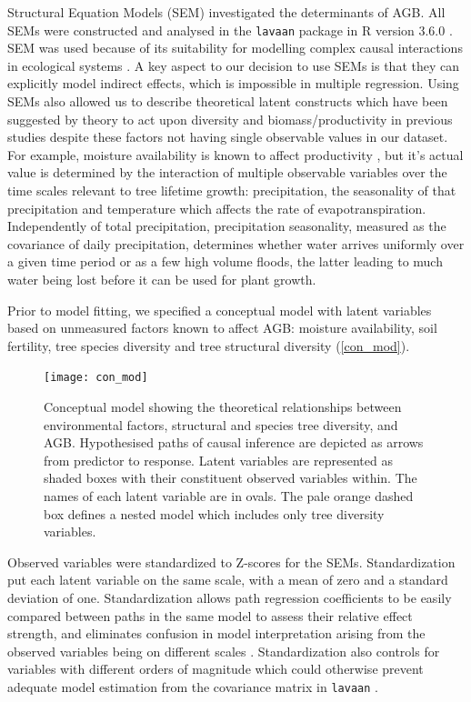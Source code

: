 \documentclass[11pt,a4paper]{article}
\begin{document}
Structural Equation Models (SEM) investigated the determinants of AGB. All SEMs were constructed and analysed in the \verb|lavaan| package in R version 3.6.0 \citep{R}. SEM was used because of its suitability for modelling complex causal interactions in ecological systems \citep{Lehmann2014_161-166}. A key aspect to our decision to use SEMs is that they can explicitly model indirect effects, which is impossible in multiple regression. Using SEMs also allowed us to describe theoretical latent constructs which have been suggested by theory to act upon diversity and biomass/productivity in previous studies despite these factors not having single observable values in our dataset. For example, moisture availability is known to affect productivity \citep{}, but it's actual value is determined by the interaction of multiple observable variables over the time scales relevant to tree lifetime growth: precipitation, the seasonality of that precipitation and temperature which affects the rate of evapotranspiration. Independently of total precipitation, precipitation seasonality, measured as the covariance of daily precipitation, determines whether water arrives uniformly over a given time period or as a few high volume floods, the latter leading to much water being lost before it can be used for plant growth. 

Prior to model fitting, we specified a conceptual model with latent variables based on unmeasured factors known to affect AGB: moisture availability, soil fertility, tree species diversity and tree structural diversity (\autoref{con_mod}). 

\begin{figure}[H]
\centering
	\texttt{[image: con\_mod]}
	\caption{Conceptual model showing the theoretical relationships between environmental factors, structural and species tree diversity, and AGB. Hypothesised paths of causal inference are depicted as arrows from predictor to response. Latent variables are represented as shaded boxes with their constituent observed variables within. The names of each latent variable are in ovals. The pale orange dashed box defines a nested model which includes only tree diversity variables.}
	\label{con_mod}
\end{figure}

Observed variables were standardized to Z-scores for the SEMs. Standardization put each latent variable on the same scale, with a mean of zero and a standard deviation of one. Standardization allows path regression coefficients to be easily compared between paths in the same model to assess their relative effect strength, and eliminates confusion in model interpretation arising from the observed variables being on different scales \citep{}. Standardization also controls for variables with different orders of magnitude which could otherwise prevent adequate model estimation from the covariance matrix in \verb|lavaan| \citep{}. 
\end{document}
